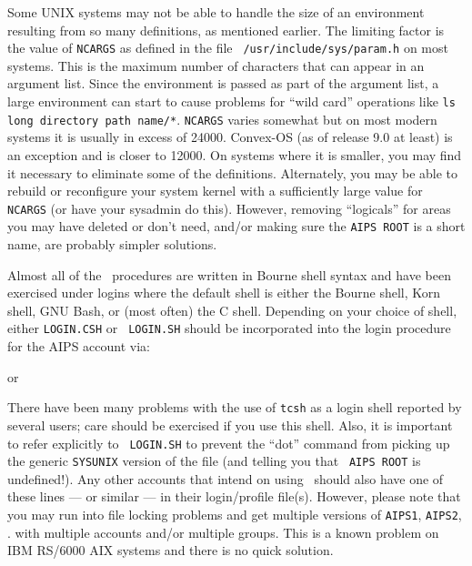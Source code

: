 Some UNIX systems may not be able to handle the size of an environment
resulting from so many definitions, as mentioned earlier.  The limiting
factor is the value of {\tt NCARGS} as defined in the file {\tt
/usr/include/\-sys/\-param.h} on most systems.  This is the maximum number
of characters that can appear in an argument list. Since the environment
is passed as part of the argument list, a large environment can start to
cause problems for ``wild card'' operations like {\tt ls long
directory path name/*}.  {\tt NCARGS} varies somewhat but on
most modern systems it is usually in excess of 24000.  Convex-OS (as of
release 9.0 at least) is an exception and is closer to 12000.  On systems
where it is smaller, you may find it necessary to eliminate some of the
definitions.  Alternately, you may be able to rebuild or reconfigure your
system kernel with a sufficiently large value for {\tt NCARGS} (or have
your sysadmin do this).  However, removing ``logicals'' for areas you may
have deleted or don't need, and/or making sure the {\tt\dol AIPS
ROOT} is a short name, are probably simpler solutions.
\medskip


Almost all of the \AIPS\ procedures are written in Bourne shell syntax
and have been exercised under logins where the default shell is either
the Bourne shell, Korn shell, GNU Bash, or (most often) the C shell.
Depending on your choice of shell, either {\tt LOGIN.CSH} or {\tt
LOGIN.SH} should be incorporated into the login procedure for the AIPS
account via:\medskip


\noindent or

\medskip

\noindent There have been many problems with the use of {\tt tcsh} as a
login shell reported by several users; care should be exercised if you
use this shell.  Also, it is important to refer explicitly to {\tt
LOGIN.SH} to prevent the ``dot'' command from picking up the generic
{\tt\dol SYSUNIX} version of the file (and telling you that {\tt
AIPS ROOT} is undefined!).  Any other accounts that intend on using
\AIPS\ should also have one of these lines --- or similar --- in their
login/profile file(s).  However, please note that you may run into file
locking problems and get multiple versions of {\tt AIPS1}, {\tt AIPS2},
\etc.  with multiple accounts and/or multiple groups.  This is a known
problem on IBM RS/6000 AIX systems and there is no quick solution.

